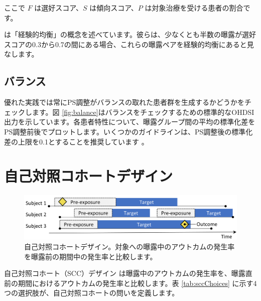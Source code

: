 \documentclass[
  11pt]{book}
\theoremstyle{definition}
\theoremstyle{definition}
\theoremstyle{definition}
\theoremstyle{definition}
\theoremstyle{remark}
\begin{document}
ここで \(F\) は選好スコア、\(S\) は傾向スコア、\(P\) は対象治療を受ける患者の割合です。

\citet{walker_2013} は「経験的均衡」の概念を述べています。彼らは、少なくとも半数の曝露が選好スコアの0.3から0.7の間にある場合、これらの曝露ペアを経験的均衡にあると見なします。 

\subsection{バランス}\label{ux30d0ux30e9ux30f3ux30b9}

 

優れた実践では常にPS調整がバランスの取れた患者群を生成するかどうかをチェックします。図 \ref{fig:balance}はバランスをチェックするための標準的なOHDSI出力を示しています。各患者特性について、曝露グループ間の平均の標準化差をPS調整前後でプロットします。いくつかのガイドラインは、PS調整後の標準化差の上限を0.1とすることを推奨しています \citep{rubin_2001}。

\section{自己対照コホートデザイン}\label{ux81eaux5df1ux5bfeux7167ux30b3ux30dbux30fcux30c8ux30c7ux30b6ux30a4ux30f3}


\begin{figure}[h]

{\centering \includegraphics[width=0.9\linewidth]{images/PopulationLevelEstimation/selfControlledCohort} 

}

\caption{自己対照コホートデザイン。対象への曝露中のアウトカムの発生率を曝露前の期間中の発生率と比較します。}\label{fig:scc}
\end{figure}

自己対照コホート（SCC）デザイン \citep{ryan_2013} は曝露中のアウトカムの発生率を、曝露直前の期間におけるアウトカムの発生率と比較します。表 \ref{tab:sccChoices} に示す4つの選択肢が、自己対照コホートの問いを定義します。  
\end{document}
